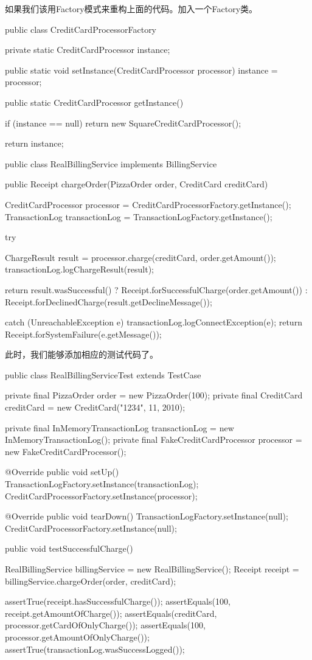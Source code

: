 如果我们该用Factory模式来重构上面的代码。加入一个Factory类。

\begin{Java}[CreditCardProcessor的工厂]
public class CreditCardProcessorFactory {

  private static CreditCardProcessor instance;

  public static void setInstance(CreditCardProcessor processor) {
    instance = processor;
  }

  public static CreditCardProcessor getInstance() {
    if (instance == null) {
      return new SquareCreditCardProcessor();
    }

    return instance;
  }
}
\end{Java}

\begin{Java}[使用Factory的服务实现]
public class RealBillingService implements BillingService {
  public Receipt chargeOrder(PizzaOrder order, CreditCard creditCard) {
    CreditCardProcessor processor = CreditCardProcessorFactory.getInstance();
    TransactionLog transactionLog = TransactionLogFactory.getInstance();

    try {
      ChargeResult result = processor.charge(creditCard, order.getAmount());
      transactionLog.logChargeResult(result);

      return result.wasSuccessful()
          ? Receipt.forSuccessfulCharge(order.getAmount())
          : Receipt.forDeclinedCharge(result.getDeclineMessage());
     } catch (UnreachableException e) {
      transactionLog.logConnectException(e);
      return Receipt.forSystemFailure(e.getMessage());
    }
  }
}
\end{Java}

此时，我们能够添加相应的测试代码了。

\begin{Java}[单元测试]
public class RealBillingServiceTest extends TestCase {

  private final PizzaOrder order = new PizzaOrder(100);
  private final CreditCard creditCard = new CreditCard("1234", 11, 2010);

  private final InMemoryTransactionLog transactionLog = new InMemoryTransactionLog();
  private final FakeCreditCardProcessor processor = new FakeCreditCardProcessor();

  @Override public void setUp() {
    TransactionLogFactory.setInstance(transactionLog);
    CreditCardProcessorFactory.setInstance(processor);
  }

  @Override public void tearDown() {
    TransactionLogFactory.setInstance(null);
    CreditCardProcessorFactory.setInstance(null);
  }

  public void testSuccessfulCharge() {
    RealBillingService billingService = new RealBillingService();
    Receipt receipt = billingService.chargeOrder(order, creditCard);

    assertTrue(receipt.hasSuccessfulCharge());
    assertEquals(100, receipt.getAmountOfCharge());
    assertEquals(creditCard, processor.getCardOfOnlyCharge());
    assertEquals(100, processor.getAmountOfOnlyCharge());
    assertTrue(transactionLog.wasSuccessLogged());
  }
}
\end{Java}

